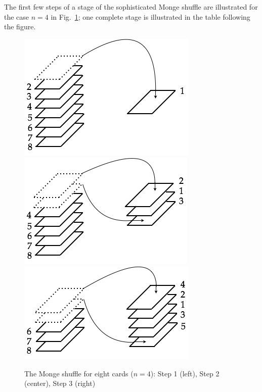 \begin{enumerate}
\begin{enumerate}
The first few steps of a stage of the sophisticated Monge shuffle are illustrated for the case $n=4$ in Fig.~\ref{fig:suffleMonge1}; one complete stage is illustrated in the table following the figure.
\begin{figure}[h]
\begin{center}
        \includegraphics[scale=0.33]{FiguresArithmetic/suffleMongeStep1}
        \includegraphics[scale=0.33]{FiguresArithmetic/suffleMongeStep2}
         \includegraphics[scale=0.33]{FiguresArithmetic/suffleMongeStep3}
        \caption{The Monge shuffle for eight cards ($n=4$): Step 1 (left), Step 2 (center), Step 3 (right)}
        \label{fig:suffleMonge1}
\end{center}
\end{figure}
\end{enumerate}
\end{enumerate}
